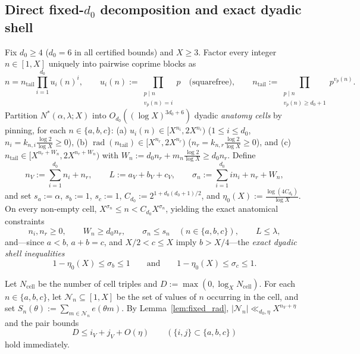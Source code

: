 \documentclass[11pt,a4paper]{amsart}
\theoremstyle{plain}
\theoremstyle{definition}
\theoremstyle{remark}
\DeclareMathOperator{\rad}{rad}
\begin{document}
\subsection{Direct fixed-\texorpdfstring{$d_0$}{d0} decomposition and exact dyadic shell}
Fix $d_0 \ge 4$ ($d_0 = 6$ in all certified bounds) and $X \ge 3$. Factor every integer $n \in [1, X]$ uniquely into pairwise coprime blocks as
\begin{equation}\label{eq:decomp}
  n = n_{\mathrm{tail}} \prod_{i=1}^{d_0} u_i(n)^i, \qquad
  u_i(n) := \prod_{\substack{p \mid n \\ v_p(n) = i}} p \quad\text{(squarefree)}, \qquad
  n_{\mathrm{tail}} := \prod_{\substack{p \mid n \\ v_p(n) \ge d_0 + 1}} p^{v_p(n)}.
\end{equation}
Partition $N^*(\alpha,\lambda;X)$ into $O_{d_0}((\log X)^{3d_0+6})$ dyadic \emph{anatomy cells} by pinning, for each $n \in \{a,b,c\}$:
(a) $u_i(n) \in [X^{n_i}, 2 X^{n_i})$ ($1 \le i \le d_0$, $n_i = k_{n,i}\frac{\log 2}{\log X} \ge 0$),
(b) $\rad(n_{\mathrm{tail}}) \in [X^{n_r}, 2 X^{n_r})$ ($n_r = k_{n,r}\frac{\log 2}{\log X} \ge 0$), and
(c) $n_{\mathrm{tail}} \in [X^{n_r + W_n}, 2 X^{n_r + W_n})$ with $W_n := d_0 n_r + m_n\frac{\log 2}{\log X} \ge d_0 n_r$.
Define
\begin{equation}\label{eq:cell_vars}
  n_V := \sum_{i=1}^{d_0} n_i + n_r, \qquad
  L := a_V + b_V + c_V, \qquad
  \sigma_n := \sum_{i=1}^{d_0} i n_i + n_r + W_n,
\end{equation}
and set $s_a := \alpha$, $s_b := 1$, $s_c := 1$, $C_{d_0} := 2^{1+d_0(d_0+1)/2}$, and $\eta_0(X) := \frac{\log(4 C_{d_0})}{\log X}$. On every non-empty cell, $X^{\sigma_n} \le n < C_{d_0} X^{\sigma_n}$, yielding the exact anatomical constraints
\begin{equation}\label{eq:base_anat}
  n_i, n_r \ge 0, \qquad
  W_n \ge d_0 n_r, \qquad
  \sigma_n \le s_n \quad (n \in \{a,b,c\}), \qquad
  L \le \lambda,
\end{equation}
and—since $a < b$, $a+b=c$, and $X/2 < c \le X$ imply $b > X/4$—the \emph{exact dyadic shell inequalities}
\begin{equation}\label{eq:bc_large}
  1 - \eta_0(X) \le \sigma_b \le 1 \qquad\text{and}\qquad 1 - \eta_0(X) \le \sigma_c \le 1.
\end{equation}

Let $N_{\mathrm{cell}}$ be the number of cell triples and $D := \max(0, \log_X N_{\mathrm{cell}})$. For each $n \in \{a,b,c\}$, let $\mathcal{N}_n \subseteq [1, X]$ be the set of values of $n$ occurring in the cell, and set $S_n(\theta) := \sum_{m \in \mathcal{N}_n} e(\theta m)$. By Lemma~\ref{lem:fixed_rad}, $|\mathcal{N}_n| \ll_{d_0,\eta} X^{n_V + \eta}$ and the pair bounds
\begin{equation}\label{eq:pair}
  D \le i_V + j_V + O(\eta) \qquad (\{i,j\} \subset \{a,b,c\})
\end{equation}
hold immediately.
\end{document}
